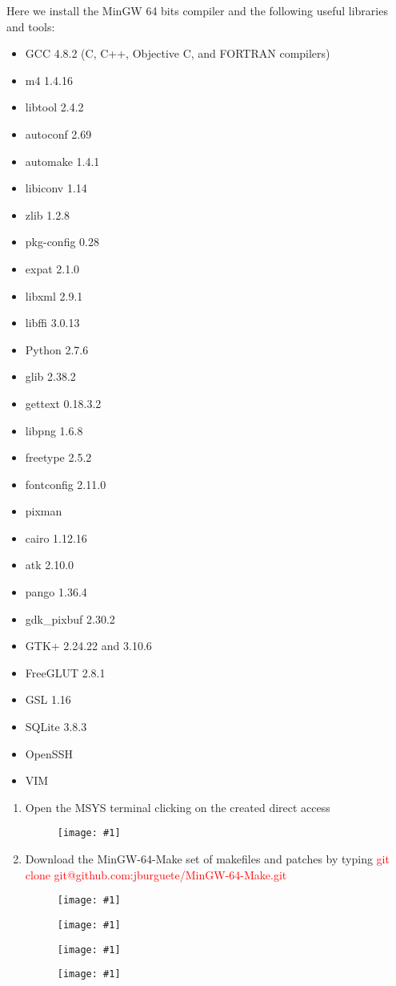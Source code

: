 \documentclass[a4paper]{article}
\newcommand{\FIGURE}[1]
{
	\begin{figure}[!ht]
	\centering
	\texttt{[image: \#1]}
	\end{figure}
}
\newcommand{\RED}[1] {\textcolor{red}{#1}}
\begin{document}
Here we install the MinGW 64 bits compiler and the following useful libraries
and tools:
\begin{itemize}
\item GCC 4.8.2 (C, C++, Objective C, and FORTRAN compilers)
\item m4 1.4.16
\item libtool 2.4.2
\item autoconf 2.69
\item automake 1.4.1
\item libiconv 1.14
\item zlib 1.2.8
\item pkg-config 0.28
\item expat 2.1.0
\item libxml 2.9.1
\item libffi 3.0.13
\item Python 2.7.6
\item glib 2.38.2
\item gettext 0.18.3.2
\item libpng 1.6.8
\item freetype 2.5.2
\item fontconfig 2.11.0
\item pixman
\item cairo 1.12.16
\item atk 2.10.0
\item pango 1.36.4
\item gdk\_pixbuf 2.30.2
\item GTK+ 2.24.22 and 3.10.6
\item FreeGLUT 2.8.1
\item GSL 1.16
\item SQLite 3.8.3
\item OpenSSH
\item VIM
\end{itemize}

\begin{enumerate}

\item Open the MSYS terminal clicking on the created direct access
\FIGURE{mingw-1.png.eps}

\item Download the MinGW-64-Make set of makefiles and patches by typing
\RED{git clone git@github.com:jburguete/MinGW-64-Make.git}
\FIGURE{mingw-2.png.eps}
\FIGURE{mingw-3.png.eps}
\FIGURE{mingw-4.png.eps}
\FIGURE{mingw-5.png.eps}

\end{enumerate}
\end{document}
